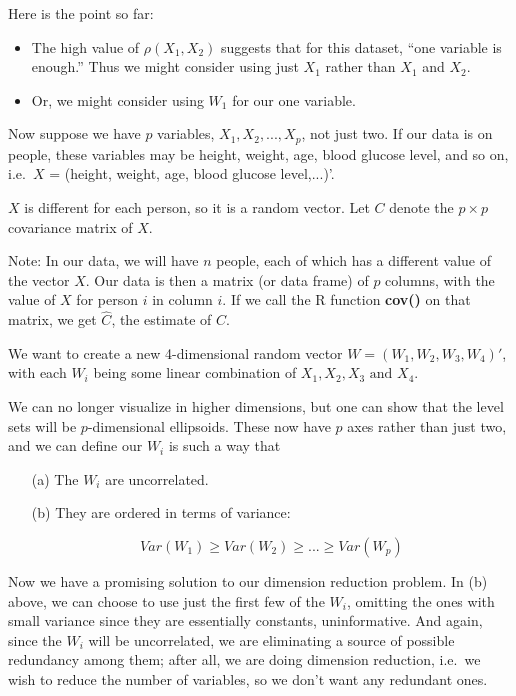 Here is the point so far:

\begin{itemize}

\item The high value of $\rho(X_1,X_2)$ suggests that for this dataset,
``one variable is enough.''  Thus we might consider using just $X_1$
rather than $X_1$ and $X_2$.

\item Or, we might consider using $W_1$ for our one
variable.  

\end{itemize} 

Now suppose we have $p$ variables, $X_1,
X_2,...,X_p$, not just two.  If our data is on people, these variables
may be height, weight, age, blood glucose level, and so on, i.e.\    
$X$ = (height, weight, age, blood glucose level,...)'.  

$X$ is different for each person, so it is a random vector.  Let $C$
denote the $p \times p$ covariance matrix of $X$.

Note:  In our data, we will have $n$ people, each of which has a
different value of the vector $X$.  Our data is then a matrix (or data
frame) of $p$ columns, with the value of $X$ for person $i$ in column
$i$.  If we call the R function \textbf{cov()} on that matrix, we get
$\widehat{C}$, the estimate of $C$.

We want to create a new 4-dimensional random vector $W =
(W_1,W_2,W_3,W_4)'$, with each $W_i$ being some linear combination of
$X_1, X_2, X_3 \textrm{ and } X_4$.

We can no longer visualize in higher dimensions, but one can show that
the level sets will be $p$-dimensional ellipsoids.  These now have $p$
axes rather than just two, and we can define our $W_i$ is such a way
that 

\begin{itemize}

\item [(a)] The $W_i$ are uncorrelated.

\item [(b)] They are ordered in terms of variance:

\begin{equation}
Var(W_1) \geq Var(W_2) \geq ... \geq Var(W_p)
\end{equation}

\end{itemize} 

Now we have a promising solution to our dimension reduction problem.  In
(b) above, we can choose to use just the first few of the $W_i$,
omitting the ones with small variance since they are essentially
constants, uninformative.  And again, since the $W_i$ will be
uncorrelated, we are eliminating a source of possible redundancy among
them; after all, we are doing dimension reduction, i.e.\ we wish to
reduce the number of variables, so we don't want any redundant ones.

